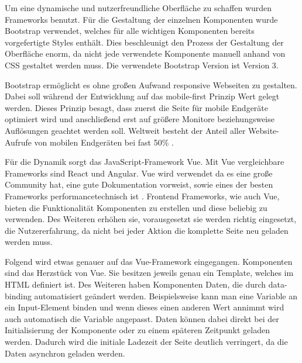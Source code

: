 Um eine dynamische und nutzerfreundliche Oberfläche zu schaffen wurden Frameworks benutzt. 
Für die Gestaltung der einzelnen Komponenten wurde Bootstrap verwendet, welches für alle wichtigen Komponenten bereits vorgefertigte Styles enthält.
Dies beschleunigt den Prozess der Gestaltung der Oberfläche enorm, da nicht jede verwendete Komponente manuell anhand von CSS gestaltet werden muss. 
Die verwendete Bootstrap Version ist Version 3.

Bootstrap ermöglicht es ohne großen Aufwand responsive Webseiten zu gestalten. 
Dabei soll während der Entwicklung auf das mobile-first Prinzip Wert gelegt werden. 
Dieses Prinzip besagt, dass zuerst die Seite für mobile Endgeräte optimiert wird und anschließend erst auf größere Monitore beziehungsweise Auflösungen geachtet werden soll. 
Weltweit besteht der Anteil aller Website-Aufrufe von mobilen Endgeräten bei fast 50\% \cite{.stat-mobile}. 

Für die Dynamik sorgt das JavaScript-Framework Vue. Mit Vue vergleichbare Frameworks sind React und Angular. Vue wird verwendet da es eine große Community hat, eine gute Dokumentation vorweist, sowie eines der besten Frameworks performancetechnisch ist \cite{.vue-react-angular}.
Frontend Frameworks, wie auch Vue, bieten die Funktionalität Komponenten zu erstellen und diese beliebig zu verwenden. 
Des Weiteren erhöhen sie, vorausgesetzt sie werden richtig eingesetzt, die Nutzererfahrung, da nicht bei jeder Aktion die komplette Seite neu geladen werden muss.

Folgend wird etwas genauer auf das Vue-Framework eingegangen. 
Komponenten sind das Herzstück von Vue. Sie besitzen jeweils genau ein Template, welches im HTML definiert ist. 
Des Weiteren haben Komponenten Daten, die durch data-binding automatisiert geändert werden. 
Beispielsweise kann man eine Variable an ein Input-Element binden und wenn dieses einen anderen Wert annimmt wird auch automatisch die Variable angepasst. 
Daten können dabei direkt bei der Initialisierung der Komponente oder zu einem späteren Zeitpunkt geladen werden.
Dadurch wird die initiale Ladezeit der Seite deutlich verringert, da die Daten asynchron geladen werden.
